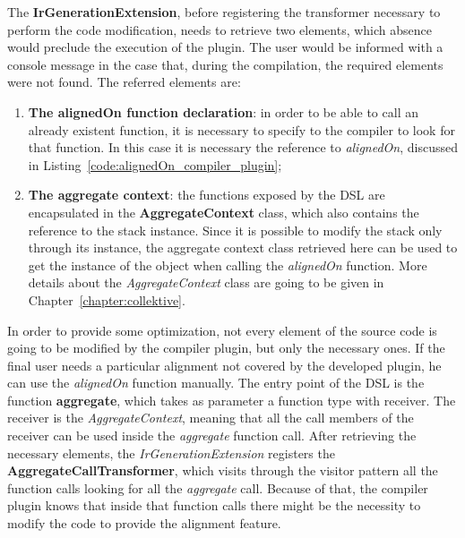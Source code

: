 The \textbf{IrGenerationExtension}, before registering the transformer necessary to perform the code modification, needs to retrieve two elements, which absence would preclude the execution of the plugin. The user would be informed with a console message in the case that, during the compilation, the required elements were not found.\newline
The referred elements are:
\begin{enumerate}
    \item \textbf{The alignedOn function declaration}: in order to be able to call an already existent function, it is necessary to specify to the compiler to look for that function. In this case it is necessary the reference to \textit{alignedOn}, discussed in Listing~\ref{code:alignedOn_compiler_plugin};
    \item \textbf{The aggregate context}: the functions exposed by the DSL are encapsulated in the \textbf{AggregateContext} class, which also contains the reference to the stack instance. Since it is possible to modify the stack only through its instance, the aggregate context class retrieved here can be used to get the instance of the object when calling the \textit{alignedOn} function. More details about the \textit{AggregateContext} class are going to be given in Chapter~\ref{chapter:collektive}.
\end{enumerate}

In order to provide some optimization, not every element of the source code is going to be modified by the compiler plugin, but only the necessary ones. If the final user needs a particular alignment not covered by the developed plugin, he can use the \textit{alignedOn} function manually.\newline
The entry point of the DSL is the function \textbf{aggregate}, which takes as parameter a function type with receiver. The receiver is the \textit{AggregateContext}, meaning that all the call members of the receiver can be used inside the \textit{aggregate} function call.\newline
After retrieving the necessary elements, the \textit{IrGenerationExtension} registers the \textbf{AggregateCallTransformer}, which visits through the visitor pattern all the function calls looking for all the \textit{aggregate} call. Because of that, the compiler plugin knows that inside that function calls there might be the necessity to modify the code to provide the alignment feature.

